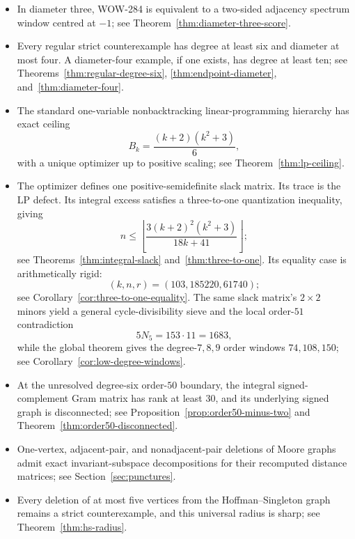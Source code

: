 \documentclass[a4paper,10pt,reqno]{amsart}
\theoremstyle{plain}
\theoremstyle{definition}
\theoremstyle{remark}
\begin{document}
\begin{itemize}
\item In diameter three, WOW-284 is equivalent to a two-sided adjacency
spectrum window centred at \(-1\); see Theorem~\ref{thm:diameter-three-score}.
\item Every regular strict counterexample has degree at least six and diameter
at most four.  A diameter-four example, if one exists, has degree at least ten;
see Theorems~\ref{thm:regular-degree-six},
\ref{thm:endpoint-diameter}, and~\ref{thm:diameter-four}.
\item The standard one-variable nonbacktracking linear-programming hierarchy
has exact ceiling
\[
 B_k=\frac{(k+2)(k^2+3)}6,
\]
with a unique optimizer up to positive scaling; see
Theorem~\ref{thm:lp-ceiling}.
\item The optimizer defines one positive-semidefinite slack matrix.  Its trace
 is the LP defect.  Its integral excess satisfies a three-to-one quantization
 inequality, giving
\[
 n\le\left\lfloor
 \frac{3(k+2)^2(k^2+3)}{18k+41}
 \right\rfloor;
\]
 see Theorems~\ref{thm:integral-slack} and~\ref{thm:three-to-one}.  Its
 equality case is arithmetically rigid:
 \[
  (k,n,r)=(103,185220,61740);
 \]
 see Corollary~\ref{cor:three-to-one-equality}.  The same slack matrix's
\(2\times2\) minors yield a general cycle-divisibility sieve and the local
order-\(51\) contradiction
\[
 5N_5=153\cdot11=1683,
\]
while the global theorem gives the degree-\(7,8,9\) order windows
\(74,108,150\); see Corollary~\ref{cor:low-degree-windows}.
\item At the unresolved degree-six order-\(50\) boundary, the integral
signed-complement Gram matrix has rank at least \(30\), and its underlying
signed graph is disconnected; see Proposition~\ref{prop:order50-minus-two}
and Theorem~\ref{thm:order50-disconnected}.
\item One-vertex, adjacent-pair, and nonadjacent-pair deletions of Moore graphs
admit exact invariant-subspace decompositions for their recomputed distance
matrices; see Section~\ref{sec:punctures}.
\item Every deletion of at most five vertices from the Hoffman--Singleton graph
remains a strict counterexample, and this universal radius is sharp; see
Theorem~\ref{thm:hs-radius}.
\end{itemize}
\end{document}
